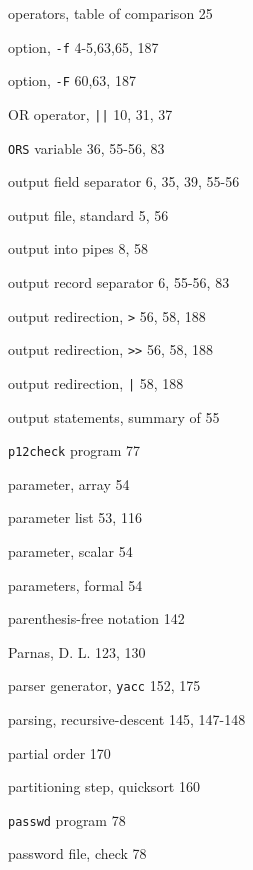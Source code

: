 \begin{multicols}{3}
\hangindent=3pc  operators, table of comparison 25

\hangindent=3pc  option, \verb'-f' 4-5,63,65, 187

\hangindent=3pc  option, \verb'-F' 60,63, 187

\hangindent=3pc  OR operator, \verb'||' 10, 31, 37

\hangindent=3pc  \verb'ORS' variable 36, 55-56, 83

\hangindent=3pc  output field separator 6, 35, 39, 55-56

\hangindent=3pc  output file, standard 5, 56

\hangindent=3pc  output into pipes 8, 58

\hangindent=3pc  output record separator 6, 55-56,  83

\hangindent=3pc  output redirection, \verb'>' 56, 58, 188

\hangindent=3pc  output redirection, \verb'>>' 56, 58, 188

\hangindent=3pc  output redirection, \verb'|' 58, 188

\hangindent=3pc  output statements, summary of 55

\hangindent=3pc  \verb'p12check' program 77

\hangindent=3pc  parameter, array 54

\hangindent=3pc  parameter list 53, 116

\hangindent=3pc  parameter, scalar 54

\hangindent=3pc  parameters, formal 54

\hangindent=3pc  parenthesis-free notation 142

\hangindent=3pc  Parnas, D. L. 123, 130

\hangindent=3pc  parser generator, \verb'yacc' 152, 175

\hangindent=3pc  parsing, recursive-descent 145, 147-148

\hangindent=3pc  partial order 170

\hangindent=3pc  partitioning step, quicksort 160

\hangindent=3pc  \verb'passwd' program 78

\hangindent=3pc  password file, check 78


\end{multicols}
